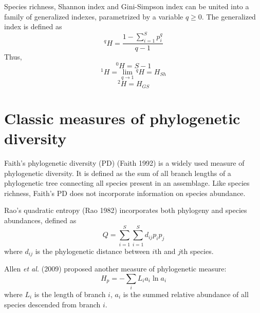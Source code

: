 \documentclass[11pt]{article}
\begin{document}
\newline

Species richness, Shannon index and Gini-Simpson index can be united into a family of generalized indexes, parametrized by a variable $q \ge 0$. 
The generalized index is defined as 
\begin{equation}
    ^{q}H = \frac{1-\sum\limits_{i=1}^{S} p_i^q}{q-1}
    \label{GeneralizedIndex}
\end{equation}
Thus,
\begin{equation}
    ^{0}H = S-1
\end{equation}
\begin{equation}
    ^{1}H = \lim\limits_{q\rightarrow 1}{^{q}H} = H_{Sh}
\end{equation}
\begin{equation}
    ^{2}H = H_{GS}
\end{equation}

\section{Classic measures of phylogenetic diversity}
\label{FaithPD}
Faith's phylogenetic diversity (PD) (Faith 1992) is a widely used measure of phylogenetic diversity. 
It is defined as the sum of all branch lengths of a phylogenetic tree connecting all species present in an assemblage. 
Like species richness, Faith's PD does not incorporate information on species abundance.

\newline

Rao's quadratic entropy (Rao 1982) incorporates both phylogeny and species abundances, defined as 
\begin{equation}
    Q = \sum\limits_{i=1}^{S}\sum\limits_{i=1}^{S} d_{ij}p_{i}p_{j}
    \label{RaoPD}
\end{equation}
where $d_{ij}$ is the phylogenetic distance between $i$th and $j$th species. 

\newline

Allen \textit{et al.} (2009) proposed another measure of phylogenetic measure: 
\begin{equation}
    H_p = -\sum\limits_{i} L_ia_i \ln a_i
    \label{AllenPD}
\end{equation}
where $L_i$ is the length of branch $i$, $a_i$ is the summed relative abundance of all species descended from branch $i$.

\newline
\end{document}
